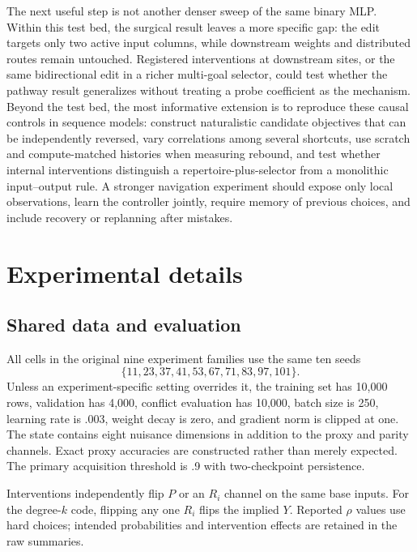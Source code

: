 \documentclass[11pt,a4paper]{article}
\begin{document}
The next useful step is not another denser sweep of the same binary MLP. Within this test bed, the surgical result leaves a more specific gap: the edit targets only two active input columns, while downstream weights and distributed routes remain untouched. Registered interventions at downstream sites, or the same bidirectional edit in a richer multi-goal selector, could test whether the pathway result generalizes without treating a probe coefficient as the mechanism. Beyond the test bed, the most informative extension is to reproduce these causal controls in sequence models: construct naturalistic candidate objectives that can be independently reversed, vary correlations among several shortcuts, use scratch and compute-matched histories when measuring rebound, and test whether internal interventions distinguish a repertoire-plus-selector from a monolithic input--output rule. A stronger navigation experiment should expose only local observations, learn the controller jointly, require memory of previous choices, and include recovery or replanning after mistakes.

\begingroup
\raggedright

\endgroup

\clearpage
\appendix
\renewcommand{\contentsname}{Appendix}
\tableofcontents

\section{Experimental details}

\subsection{Shared data and evaluation}

All cells in the original nine experiment families use the same ten seeds
\[
\{11,23,37,41,53,67,71,83,97,101\}.
\]
Unless an experiment-specific setting overrides it, the training set has 10,000 rows, validation has 4,000, conflict evaluation has 10,000, batch size is 250, learning rate is .003, weight decay is zero, and gradient norm is clipped at one. The state contains eight nuisance dimensions in addition to the proxy and parity channels. Exact proxy accuracies are constructed rather than merely expected. The primary acquisition threshold is .9 with two-checkpoint persistence.

Interventions independently flip $P$ or an $R_i$ channel on the same base inputs. For the degree-$k$ code, flipping any one $R_i$ flips the implied $Y$. Reported $\rho$ values use hard choices; intended probabilities and intervention effects are retained in the raw summaries.
\end{document}
